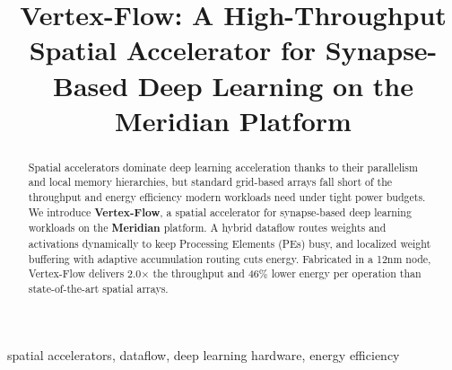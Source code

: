 \documentclass[conference]{IEEEtran}
\begin{document}
\title{Vertex-Flow: A High-Throughput Spatial Accelerator for Synapse-Based Deep Learning
on the Meridian Platform}

\author{
}


\maketitle

\noindent{}

\begin{abstract}
Spatial accelerators dominate deep learning acceleration thanks to their parallelism and
local memory hierarchies, but standard grid-based arrays fall short of the throughput and
energy efficiency modern workloads need under tight power budgets. We introduce
\textbf{Vertex-Flow}, a spatial accelerator for synapse-based deep learning workloads on the
\textbf{Meridian} platform. A hybrid dataflow routes weights and activations dynamically to
keep Processing Elements (PEs) busy, and localized weight buffering with adaptive
accumulation routing cuts energy. Fabricated in a 12nm node, Vertex-Flow delivers
2.0$\times$ the throughput and 46\% lower energy per operation than state-of-the-art spatial
arrays.
\end{abstract}

\begin{IEEEkeywords}
spatial accelerators, dataflow, deep learning hardware, energy efficiency
\end{IEEEkeywords}











\end{document}

